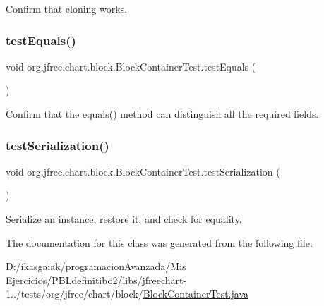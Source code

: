 Confirm that cloning works. \mbox{\label{classorg_1_1jfree_1_1chart_1_1block_1_1_block_container_test_ad1e8b79526baca47bc5747b59ee9dac2}} 
\subsubsection{\texorpdfstring{test\+Equals()}{testEquals()}}
{\footnotesize\ttfamily void org.\+jfree.\+chart.\+block.\+Block\+Container\+Test.\+test\+Equals (\begin{DoxyParamCaption}{ }\end{DoxyParamCaption})}

Confirm that the equals() method can distinguish all the required fields. \mbox{\label{classorg_1_1jfree_1_1chart_1_1block_1_1_block_container_test_abc3b91d9398f426e03f54f04803b3292}} 
\subsubsection{\texorpdfstring{test\+Serialization()}{testSerialization()}}
{\footnotesize\ttfamily void org.\+jfree.\+chart.\+block.\+Block\+Container\+Test.\+test\+Serialization (\begin{DoxyParamCaption}{ }\end{DoxyParamCaption})}

Serialize an instance, restore it, and check for equality. 

The documentation for this class was generated from the following file\+:\begin{DoxyCompactItemize}
\item 
D\+:/ikasgaiak/programacion\+Avanzada/\+Mis Ejercicios/\+P\+B\+Ldefinitibo2/libs/jfreechart-\/1../tests/org/jfree/chart/block/\mbox{\hyperlink{_block_container_test_8java}{Block\+Container\+Test.\+java}}\end{DoxyCompactItemize}
